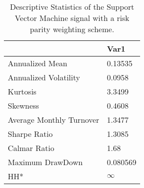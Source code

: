 \begin{table}[H]
\centering
\begin{tabular}{ll}
& Var1 \\ 
\hline 
Annualized Mean & 0.13535 \\ 
Annualized Volatility & 0.0958 \\ 
Kurtosis & 3.3499 \\ 
Skewness & 0.4608 \\ 
Average Monthly Turnover & 1.3477 \\ 
Sharpe Ratio & 1.3085 \\ 
Calmar Ratio & 1.68 \\ 
Maximum DrawDown & 0.080569 \\ 
HH* & $\infty$ \\ 
\hline
\end{tabular}
\caption{Descriptive Statistics of the Support Vector Machine signal with a risk parity weighting scheme.}
\label{SVM_MODEL_Risk}
\end{table}